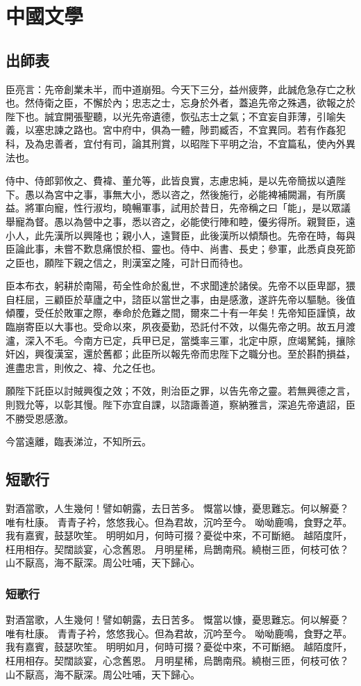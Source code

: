 
\chapter{中國文學}

\section{出師表}

臣亮言：先帝創業未半，而中道崩殂。今天下三分，益州疲弊，此誠危急存亡之秋也。然侍衛之臣，不懈於內；忠志之士，忘身於外者，蓋追先帝之殊遇，欲報之於陛下也。誠宜開張聖聽，以光先帝遺德，恢弘志士之氣；不宜妄自菲薄，引喻失義，以塞忠諫之路也。宮中府中，俱為一體，陟罰臧否，不宜異同。若有作姦犯科，及為忠善者，宜付有司，論其刑賞，以昭陛下平明之治，不宜篇私，使內外異法也。\par

侍中、侍郎郭攸之、費褘、董允等，此皆良實，志慮忠純，是以先帝簡拔以遺陛下。愚以為宮中之事，事無大小，悉以咨之，然後施行，必能裨補闕漏，有所廣益。將軍向寵，性行淑均，曉暢軍事，試用於昔日，先帝稱之曰「能」，是以眾議舉寵為督。愚以為營中之事，悉以咨之，必能使行陣和睦，優劣得所。親賢臣，遠小人，此先漢所以興隆也；親小人，遠賢臣，此後漢所以傾頹也。先帝在時，每與臣論此事，未嘗不歎息痛恨於桓、靈也。侍中、尚書、長史；參軍，此悉貞良死節之臣也，願陛下親之信之，則漢室之隆，可計日而待也。

臣本布衣，躬耕於南陽，苟全性命於亂世，不求聞達於諸侯。先帝不以臣卑鄙，猥自枉屈，三顧臣於草廬之中，諮臣以當世之事，由是感激，遂許先帝以驅馳。後值傾覆，受任於敗軍之際，奉命於危難之間，爾來二十有一年矣！先帝知臣謹慎，故臨崩寄臣以大事也。受命以來，夙夜憂勤，恐託付不效，以傷先帝之明。故五月渡瀘，深入不毛。今南方已定，兵甲已足，當獎率三軍，北定中原，庶竭駑鈍，攘除奸凶，興復漢室，還於舊都；此臣所以報先帝而忠陛下之職分也。至於斟酌損益，進盡忠言，則攸之、褘、允之任也。

願陛下託臣以討賊興復之效；不效，則治臣之罪，以告先帝之靈。若無興德之言，則戮允等，以彰其慢。陛下亦宜自課，以諮諏善道，察納雅言，深追先帝遺詔，臣不勝受恩感激。

今當遠離，臨表涕泣，不知所云。

\section{短歌行}

對酒當歌，人生幾何！譬如朝露，去日苦多。
慨當以慷，憂思難忘。何以解憂？唯有杜康。
青青子衿，悠悠我心。但為君故，沉吟至今。
呦呦鹿鳴，食野之苹。我有嘉賓，鼓瑟吹笙。
明明如月，何時可掇？憂從中來，不可斷絕。
越陌度阡，枉用相存。契闊談宴，心念舊恩。
月明星稀，烏鵲南飛。繞樹三匝，何枝可依？
山不厭高，海不厭深。周公吐哺，天下歸心。

\subsection{短歌行}

對酒當歌，人生幾何！譬如朝露，去日苦多。
慨當以慷，憂思難忘。何以解憂？唯有杜康。
青青子衿，悠悠我心。但為君故，沉吟至今。
呦呦鹿鳴，食野之苹。我有嘉賓，鼓瑟吹笙。
明明如月，何時可掇？憂從中來，不可斷絕。
越陌度阡，枉用相存。契闊談宴，心念舊恩。
月明星稀，烏鵲南飛。繞樹三匝，何枝可依？
山不厭高，海不厭深。周公吐哺，天下歸心。